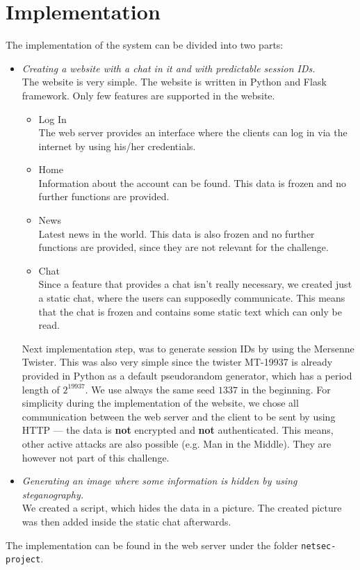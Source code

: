 \documentclass[11pt]{article}
\begin{document}
\section{Implementation}

The implementation of the system can be divided into two parts:
\begin{itemize}
	\item \textit{Creating a website with a chat in it and with predictable session IDs.} \\
	 The website is very simple. The website is written in Python and Flask framework. Only few features are supported in the website. 
\begin{itemize}
\item Log In\\
The web server provides an interface where the clients can log in via the internet by using his/her credentials. 
					
\item Home\\
Information about the account can be found. This data is frozen and no further functions are provided.
				
\item News\\
Latest news in the world. This data is also frozen and no further functions are provided, since they are not relevant for the challenge.
				
\item Chat\\
Since a feature that provides a chat isn't really necessary, we created just a static chat, where the users can supposedly communicate. This means that the chat is frozen and contains some static text which can only be read.
				
\end{itemize}			 
	 
	  Next implementation step, was to generate session IDs by using the Mersenne Twister. This was also very simple since the twister MT-19937 is already provided in Python as a default pseudorandom generator, which has a period length of $2^{19937}$. We use always the same seed $1337$ in the beginning. For simplicity during the implementation of the website, we chose all communication between the web server and the client to be sent by using HTTP --- the data is \textbf{not} encrypted and \textbf{not} authenticated. This means, other active attacks are also possible (e.g. Man in the Middle). They are however not part of this challenge. 

	  
	\item \textit{Generating an image where some information is hidden by using steganography.}\\
	We created a script, which hides the data in a picture. The created picture was then added inside the static chat afterwards.
\end{itemize}

The implementation can be found in the web server under the folder \texttt{netsec-project}.
\begin{spacing}{1}
  
  
\end{spacing}
\end{document}
